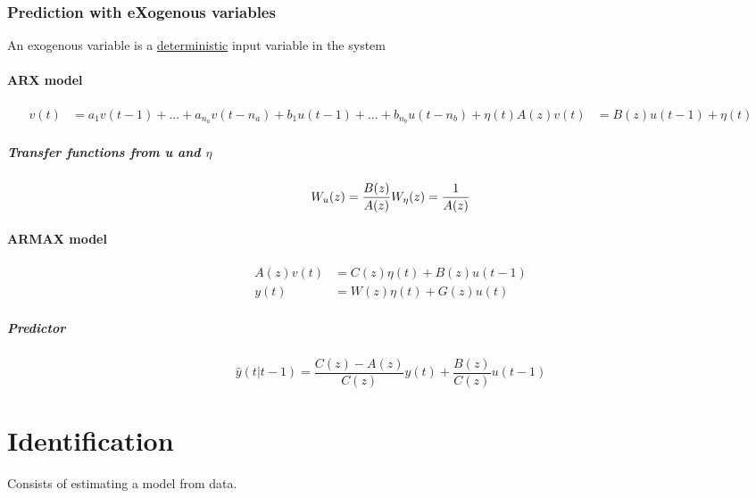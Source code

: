\documentclass{report}
\begin{document}
\subsection{Prediction with eXogenous variables}
An exogenous variable is a \underline{deterministic} input variable in the system
\subsubsection{ARX model}
\begin{align*}
v(t)&=a_1v(t-1)+...+a_{n_a}v(t-n_a)+b_1u(t-1)+...+b_{n_b}u(t-n_b)+\eta(t)
A(z)v(t)&=B(z)u(t-1)+\eta(t)
\end{align*}
\paragraph{Transfer functions from u and $\eta$}
\[
W_u(z)=\frac{B(z)}{A(z)}\\
W_{\eta}(z)=\frac{1}{A(z)}
\]
\subsubsection{ARMAX model}
\begin{align*}
A(z)v(t)&=C(z)\eta(t)+B(z)u(t-1)\\
y(t)&=W(z)\eta(t)+G(z)u(t)
\end{align*}
\paragraph{Predictor}
\[
\hat{y}(t|t-1)=
\frac{C(z)-A(z)}{C(z)}y(t)
+\frac{B(z)}{C(z)}u(t-1)
\]

\newpage
\chapter{Identification}
Consists of estimating a model from data.
\end{document}
